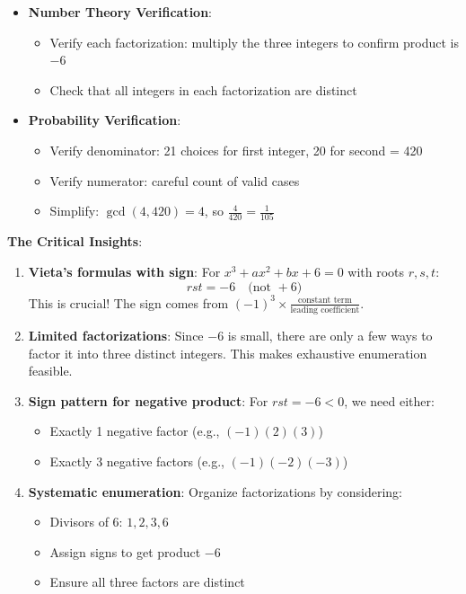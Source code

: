 \documentclass[12pt]{article}
\begin{document}
\begin{verificationbox}
\begin{itemize}[leftmargin=*]
    \item \textbf{Number Theory Verification}:
    \begin{itemize}
        \item Verify each factorization: multiply the three integers to confirm product is $-6$
        \item Check that all integers in each factorization are distinct
    \end{itemize}
    
    \item \textbf{Probability Verification}:
    \begin{itemize}
        \item Verify denominator: 21 choices for first integer, 20 for second = 420
        \item Verify numerator: careful count of valid cases
        \item Simplify: $\gcd(4, 420) = 4$, so $\frac{4}{420} = \frac{1}{105}$
    \end{itemize}
\end{itemize}
\end{verificationbox}

\begin{keyinsightbox}
\textbf{The Critical Insights}:

\begin{enumerate}
    \item \textbf{Vieta's formulas with sign}: For $x^3 + ax^2 + bx + 6 = 0$ with roots $r, s, t$:
    $$rst = -6 \quad \text{(not } +6\text{)}$$
    This is crucial! The sign comes from $(-1)^3 \times \frac{\text{constant term}}{\text{leading coefficient}}$.
    
    \item \textbf{Limited factorizations}: Since $-6$ is small, there are only a few ways to factor it into three distinct integers. This makes exhaustive enumeration feasible.
    
    \item \textbf{Sign pattern for negative product}: For $rst = -6 < 0$, we need either:
    \begin{itemize}
        \item Exactly 1 negative factor (e.g., $(-1)(2)(3)$)
        \item Exactly 3 negative factors (e.g., $(-1)(-2)(-3)$)
    \end{itemize}
    
    \item \textbf{Systematic enumeration}: Organize factorizations by considering:
    \begin{itemize}
        \item Divisors of 6: $1, 2, 3, 6$
        \item Assign signs to get product $-6$
        \item Ensure all three factors are distinct
    \end{itemize}
\end{enumerate}
\end{keyinsightbox}
\end{document}
